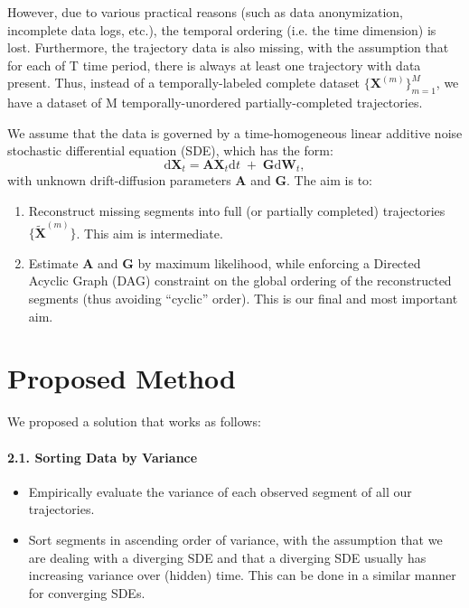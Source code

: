 \documentclass[a4paper, 11pt]{article}
\begin{document}
\begin{sloppypar}
However, due to various practical reasons (such as data anonymization, 
incomplete data logs, etc.), the temporal ordering (i.e. the time dimension) is lost.
Furthermore, the trajectory data is also missing, with the assumption that for each of
T time period, there is always at least one trajectory with data present. Thus, instead
of a temporally-labeled complete dataset $\{\mathbf{X}^{(m)}\}_{m=1}^M$,
we have a dataset of M temporally-unordered partially-completed trajectories.

We assume that the data is governed by a time-homogeneous linear additive noise stochastic
differential equation (SDE), which has the form:
\[
\mathrm{d}\mathbf{X}_t 
= 
\mathbf{A}\mathbf{X}_t\mathrm{d}t 
\;+\; 
\mathbf{G}\mathrm{d}\mathbf{W}_t,
\]
with unknown drift-diffusion parameters $\mathbf{A}$ and $\mathbf{G}$. The aim is to:
\begin{enumerate}
\item Reconstruct missing segments into full (or partially completed) trajectories
$\{\widetilde{\mathbf{X}}^{(m)}\}$. This aim is intermediate.
\item Estimate $\mathbf{A}$ and $\mathbf{G}$ by maximum likelihood, while enforcing a Directed
Acyclic Graph (DAG) constraint on the global ordering of the reconstructed segments
(thus avoiding ``cyclic'' order). This is our final and most important aim.
\end{enumerate}

\section{Proposed Method}\label{s:2}
We proposed a solution that works as follows:

\paragraph{2.1. Sorting Data by Variance}
\begin{itemize}
  \item Empirically evaluate the variance of each observed segment of all
  our trajectories.
  \item Sort segments in ascending order of variance, with the assumption that we
  are dealing with a diverging SDE and that a diverging SDE usually has increasing
  variance over (hidden) time. This can be done in a similar manner for converging SDEs.
\end{itemize}


\end{sloppypar}
\end{document}

